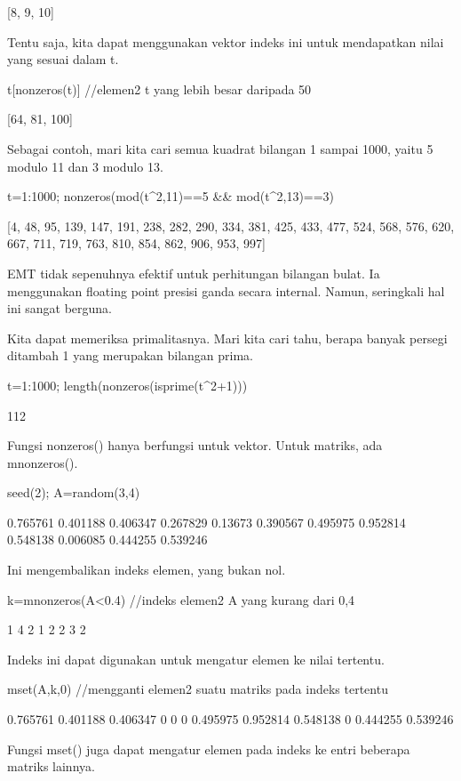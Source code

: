 \documentclass{article}
\begin{document}
    [8,  9,  10]

Tentu saja, kita dapat menggunakan vektor indeks ini untuk mendapatkan
nilai yang sesuai dalam t.


\>t[nonzeros(t)] //elemen2 t yang lebih besar daripada 50


    [64,  81,  100]

Sebagai contoh, mari kita cari semua kuadrat bilangan 1 sampai 1000,
yaitu 5 modulo 11 dan 3 modulo 13.


\>t=1:1000; nonzeros(mod(t^2,11)==5 && mod(t^2,13)==3)


    [4,  48,  95,  139,  147,  191,  238,  282,  290,  334,  381,  425,
    433,  477,  524,  568,  576,  620,  667,  711,  719,  763,  810,  854,
    862,  906,  953,  997]

EMT tidak sepenuhnya efektif untuk perhitungan bilangan bulat. Ia
menggunakan floating point presisi ganda secara internal. Namun,
seringkali hal ini sangat berguna.


Kita dapat memeriksa primalitasnya. Mari kita cari tahu, berapa banyak
persegi ditambah 1 yang merupakan bilangan prima.


\>t=1:1000; length(nonzeros(isprime(t^2+1)))


    112

Fungsi nonzeros() hanya berfungsi untuk vektor. Untuk matriks, ada
mnonzeros().


\>seed(2); A=random(3,4)


         0.765761      0.401188      0.406347      0.267829 
          0.13673      0.390567      0.495975      0.952814 
         0.548138      0.006085      0.444255      0.539246 

Ini mengembalikan indeks elemen, yang bukan nol.


\>k=mnonzeros(A<0.4) //indeks elemen2 A yang kurang dari 0,4


                1             4 
                2             1 
                2             2 
                3             2 

Indeks ini dapat digunakan untuk mengatur elemen ke nilai tertentu.


\>mset(A,k,0) //mengganti elemen2 suatu matriks pada indeks tertentu


         0.765761      0.401188      0.406347             0 
                0             0      0.495975      0.952814 
         0.548138             0      0.444255      0.539246 

Fungsi mset() juga dapat mengatur elemen pada indeks ke entri beberapa
matriks lainnya.
\end{document}
